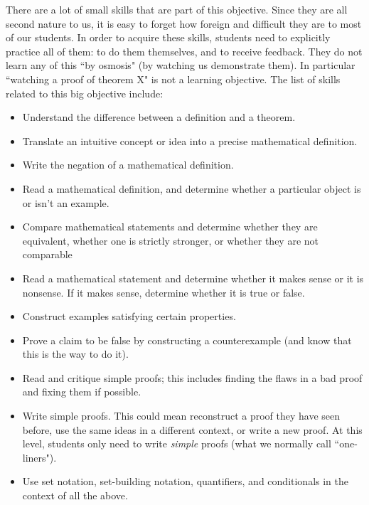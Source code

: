 \documentclass[11pt]{article}
\begin{document}
	There are a lot of small skills that are part of this objective. Since they are all second nature to us, it is easy to forget how foreign and difficult they are to most of our students. In order to acquire these skills, students need to explicitly practice all of them: to do them themselves, and to receive feedback. They do not learn any of this ``by osmosis" (by watching us demonstrate them). In particular ``watching a proof of theorem X" is not a learning objective.
	The list of skills related to this big objective include:
	\begin{itemize}
		\item Understand the difference between a definition and a theorem.

		\item Translate an intuitive concept or idea into a precise mathematical definition.

		\item Write the negation of a mathematical definition.

		\item Read a mathematical definition, and determine whether a particular
			object is or isn't an example.

		\item Compare mathematical statements and determine whether they are equivalent,
			whether one is strictly stronger, or whether they are not comparable

		\item Read a mathematical statement and determine whether it makes sense or it
			is nonsense. If it makes sense, determine whether it is true or false.

		\item Construct examples satisfying certain properties.

		\item Prove a claim to be false by constructing a counterexample (and know
			that this is the way to do it).

		\item Read and critique simple proofs; this includes finding the flaws in a
			bad proof and fixing them if possible.

		\item Write simple proofs. This could mean reconstruct a proof they have
			seen before, use the same ideas in a different context, or write a new
			proof. At this level, students only need to write \emph{simple} proofs (what
			we normally call ``one-liners").

		\item Use set notation, set-building notation, quantifiers, and conditionals
			in the context of all the above.


\end{itemize}
\end{document}
